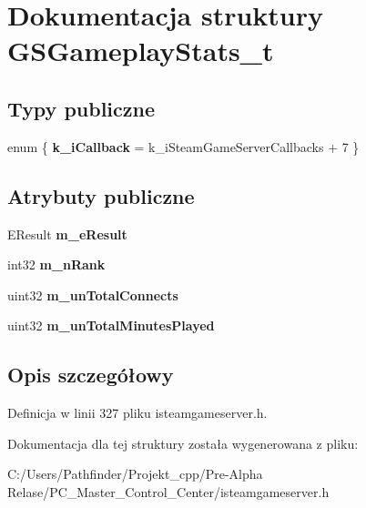 \hypertarget{struct_g_s_gameplay_stats__t}{}\section{Dokumentacja struktury G\+S\+Gameplay\+Stats\+\_\+t}
\label{struct_g_s_gameplay_stats__t}
\subsection*{Typy publiczne}
\begin{DoxyCompactItemize}
\item 
\mbox{\label{struct_g_s_gameplay_stats__t_adb2adc1ff90bfded8709e127c2e20a29}} 
enum \{ {\bfseries k\+\_\+i\+Callback} = k\+\_\+i\+Steam\+Game\+Server\+Callbacks + 7
 \}
\end{DoxyCompactItemize}
\subsection*{Atrybuty publiczne}
\begin{DoxyCompactItemize}
\item 
\mbox{\label{struct_g_s_gameplay_stats__t_a4d749039980e994b290eefb8c2f90fd0}} 
E\+Result {\bfseries m\+\_\+e\+Result}
\item 
\mbox{\label{struct_g_s_gameplay_stats__t_a46cf95fd921bb78720d7ff05d4a29e04}} 
int32 {\bfseries m\+\_\+n\+Rank}
\item 
\mbox{\label{struct_g_s_gameplay_stats__t_a9ad119860eb259a4c6cfc83e2f5256ee}} 
uint32 {\bfseries m\+\_\+un\+Total\+Connects}
\item 
\mbox{\label{struct_g_s_gameplay_stats__t_a070754c97a9d962ede6c1988a8de4309}} 
uint32 {\bfseries m\+\_\+un\+Total\+Minutes\+Played}
\end{DoxyCompactItemize}


\subsection{Opis szczegółowy}


Definicja w linii 327 pliku isteamgameserver.\+h.



Dokumentacja dla tej struktury została wygenerowana z pliku\+:\begin{DoxyCompactItemize}
\item 
C\+:/\+Users/\+Pathfinder/\+Projekt\+\_\+cpp/\+Pre-\/\+Alpha Relase/\+P\+C\+\_\+\+Master\+\_\+\+Control\+\_\+\+Center/isteamgameserver.\+h\end{DoxyCompactItemize}
